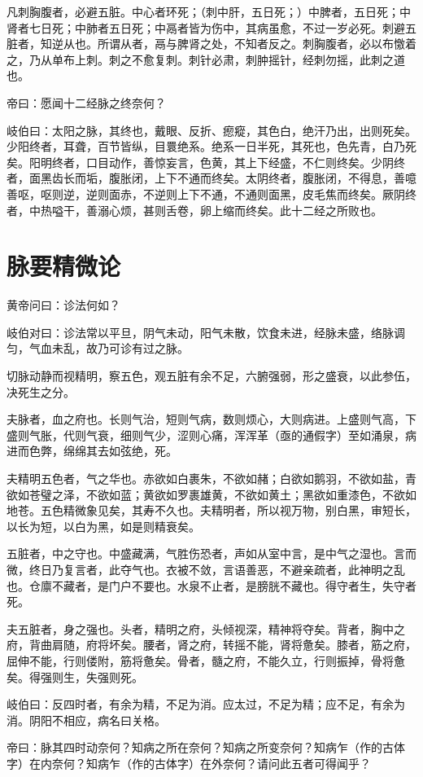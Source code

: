 \documentclass{article}%
\begin{document}
凡刺胸腹者，必避五脏。中心者环死；（刺中肝，五日死；）中脾者，五日死；中肾者七日死；中肺者五日死；中鬲者皆为伤中，其病虽愈，不过一岁必死。刺避五脏者，知逆从也。所谓从者，鬲与脾肾之处，不知者反之。刺胸腹者，必以布憿着之，乃从单布上刺。刺之不愈复刺。刺针必肃，刺肿摇针，经刺勿摇，此刺之道也。

帝曰：愿闻十二经脉之终奈何？

岐伯曰：太阳之脉，其终也，戴眼、反折、瘛瘲，其色白，绝汗乃出，出则死矣。少阳终者，耳聋，百节皆纵，目睘绝系。绝系一日半死，其死也，色先青，白乃死矣。阳明终者，口目动作，善惊妄言，色黄，其上下经盛，不仁则终矣。少阴终者，面黑齿长而垢，腹胀闭，上下不通而终矣。太阴终者，腹胀闭，不得息，善噫善呕，呕则逆，逆则面赤，不逆则上下不通，不通则面黑，皮毛焦而终矣。厥阴终者，中热嗌干，善溺心烦，甚则舌卷，卵上缩而终矣。此十二经之所败也。
\section{脉要精微论}
黄帝问曰：诊法何如？

岐伯对曰：诊法常以平旦，阴气未动，阳气未散，饮食未进，经脉未盛，络脉调匀，气血未乱，故乃可诊有过之脉。

切脉动静而视精明，察五色，观五脏有余不足，六腑强弱，形之盛衰，以此参伍，决死生之分。

夫脉者，血之府也。长则气治，短则气病，数则烦心，大则病进。上盛则气高，下盛则气胀，代则气衰，细则气少，涩则心痛，浑浑革（亟的通假字）至如涌泉，病进而色弊，绵绵其去如弦绝，死。

夫精明五色者，气之华也。赤欲如白裹朱，不欲如赭；白欲如鹅羽，不欲如盐，青欲如苍璧之泽，不欲如蓝；黄欲如罗裹雄黄，不欲如黄土；黑欲如重漆色，不欲如地苍。五色精微象见矣，其寿不久也。夫精明者，所以视万物，别白黑，审短长，以长为短，以白为黑，如是则精衰矣。

五脏者，中之守也。中盛藏满，气胜伤恐者，声如从室中言，是中气之湿也。言而微，终日乃复言者，此夺气也。衣被不敛，言语善恶，不避亲疏者，此神明之乱也。仓廪不藏者，是门户不要也。水泉不止者，是膀胱不藏也。得守者生，失守者死。

夫五脏者，身之强也。头者，精明之府，头倾视深，精神将夺矣。背者，胸中之府，背曲肩随，府将坏矣。腰者，肾之府，转摇不能，肾将惫矣。膝者，筋之府，屈伸不能，行则偻附，筋将惫矣。骨者，髓之府，不能久立，行则振掉，骨将惫矣。得强则生，失强则死。

岐伯曰：反四时者，有余为精，不足为消。应太过，不足为精；应不足，有余为消。阴阳不相应，病名曰关格。

帝曰：脉其四时动奈何？知病之所在奈何？知病之所变奈何？知病乍（作的古体字）在内奈何？知病乍（作的古体字）在外奈何？请问此五者可得闻乎？
\end{document}
